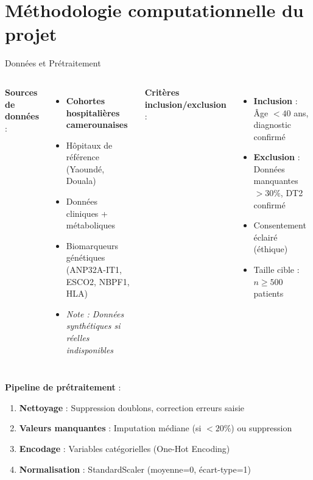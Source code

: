 \documentclass[11pt, aspectratio=169]{beamer}
\begin{document}
\section{Méthodologie computationnelle du projet}

\begin{frame}{Données et Prétraitement}
  \begin{columns}[T]
    \textbf{\color{accent2} Sources de données} :
    \begin{itemize}
      \item \textbf{Cohortes hospitalières camerounaises}
      \item Hôpitaux de référence (Yaoundé, Douala)
      \item Données cliniques + métaboliques
      \item Biomarqueurs génétiques (ANP32A-IT1, ESCO2, NBPF1, HLA)
      \item \textit{Note : Données synthétiques si réelles indisponibles}
    \end{itemize}
    
    \textbf{\color{accent2} Critères inclusion/exclusion} :
    \begin{itemize}
      \item \textbf{Inclusion} : Âge $<40$ ans, diagnostic confirmé
      \item \textbf{Exclusion} : Données manquantes $>30\%$, DT2 confirmé
      \item Consentement éclairé (éthique)
      \item Taille cible : $n \geq 500$ patients
    \end{itemize}
  \end{columns}
  
  \vspace{1em}
  
  \textbf{\color{accent2} Pipeline de prétraitement} :
  \begin{enumerate}
    \item \textbf{Nettoyage} : Suppression doublons, correction erreurs saisie
    \item \textbf{Valeurs manquantes} : Imputation médiane (si $<20\%$) ou suppression
    \item \textbf{Encodage} : Variables catégorielles (One-Hot Encoding)
    \item \textbf{Normalisation} : StandardScaler (moyenne=0, écart-type=1)
  \end{enumerate}
\end{frame}
\end{document}
